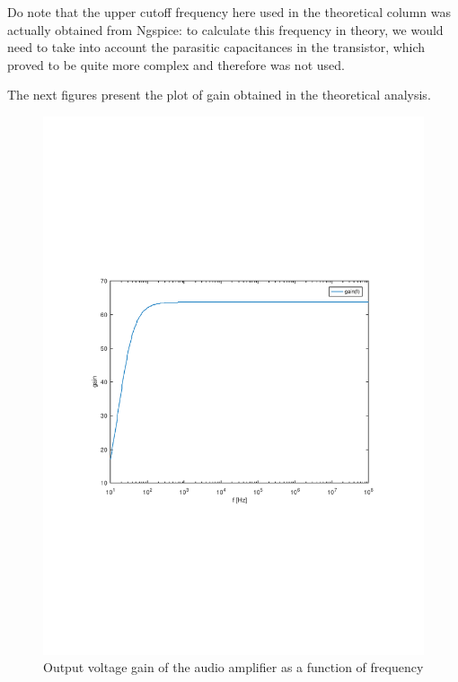 Do note that the upper cutoff frequency here used in the theoretical column was actually obtained from Ngspice: to calculate this frequency in theory, we would need to take into account the parasitic capacitances in the transistor, which proved to be quite more complex and therefore was not used.


  The next figures present the plot of gain obtained in the theoretical analysis.


\begin{figure}[H] \centering
\includegraphics[width=0.6\linewidth]{gain_octave.pdf}
\caption{Output voltage gain of the audio amplifier as a function of frequency}
\label{fig:gain_octa}
\end{figure}




\pagebreak


